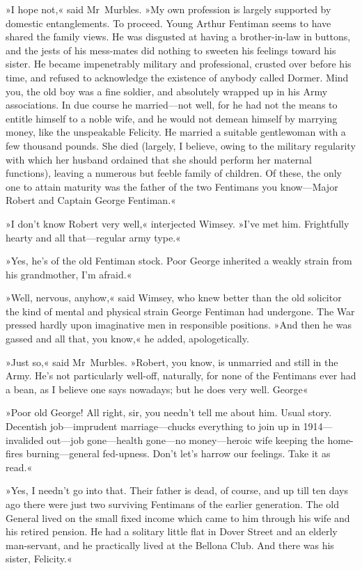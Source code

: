»I hope not,« said Mr~Murbles. »My own profession is largely supported by domestic entanglements. To proceed. Young Arthur Fentiman seems to have shared the family views. He was disgusted at having a brother-in-law in buttons, and the jests of his mess-mates did nothing to sweeten his feelings toward his sister. He became impenetrably military and professional, crusted over before his time, and refused to acknowledge the existence of anybody called Dormer. Mind you, the old boy was a fine soldier, and absolutely wrapped up in his Army associations. In due course he married—not well, for he had not the means to entitle himself to a noble wife, and he would not demean himself by marrying money, like the unspeakable Felicity. He married a suitable gentlewoman with a few thousand pounds. She died (largely, I believe, owing to the military regularity with which her husband ordained that she should perform her maternal functions), leaving a numerous but feeble family of children. Of these, the only one to attain maturity was the father of the two Fentimans you know—Major Robert and Captain George Fentiman.«

»I don't know Robert very well,« interjected Wimsey. »I've met him. Frightfully hearty and all that—regular army type.«

»Yes, he's of the old Fentiman stock. Poor George inherited a weakly strain from his grandmother, I'm afraid.«

»Well, nervous, anyhow,« said Wimsey, who knew better than the old solicitor the kind of mental and physical strain George Fentiman had undergone. The War pressed hardly upon imaginative men in responsible positions. »And then he was gassed and all that, you know,« he added, apologetically.

»Just so,« said Mr~Murbles. »Robert, you know, is unmarried and still in the Army. He's not particularly well-off, naturally, for none of the Fentimans ever had a bean, as I believe one says nowadays; but he does very well. George\longdash«

»Poor old George! All right, sir, you needn't tell me about him. Usual story. Decentish job—imprudent marriage—chucks everything to join up in 1914—invalided out—job gone—health gone—no money—heroic wife keeping the home-fires burning—general fed-upness. Don't let's harrow our feelings. Take it as read.«

»Yes, I needn't go into that. Their father is dead, of course, and up till ten days ago there were just two surviving Fentimans of the earlier generation. The old General lived on the small fixed income which came to him through his wife and his retired pension. He had a solitary little flat in Dover Street and an elderly man-servant, and he practically lived at the Bellona Club. And there was his sister, Felicity.«


